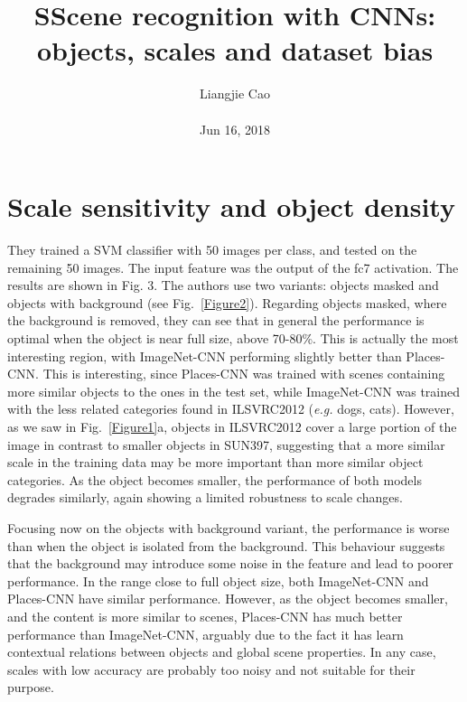 \documentclass[10pt,twocolumn,letterpaper]{article}
\begin{document}
\title{\textbf{SScene recognition with CNNs: objects, scales and dataset bias}}
\author{Liangjie Cao\\\\ Jun 16, 2018}
\maketitle
\section{Scale sensitivity and object density}
 They trained a SVM classifier with 50 images per class, and tested on the remaining 50 images. The input feature was the output of the fc7 activation. The results are shown in Fig. 3. The authors use two variants: objects masked and objects with background (see Fig.~\ref{Figure2}). Regarding objects masked, where the background is removed, they can see that in general the performance is optimal when the object is near full size, above 70-80\%. This is actually the most interesting region, with ImageNet-CNN performing slightly better than Places-CNN. This is interesting, since Places-CNN was trained with scenes containing more similar objects to the ones in the test set, while ImageNet-CNN was trained with the less related categories found in ILSVRC2012 (\emph{e.g.} dogs, cats). However, as we saw in Fig.~\ref{Figure1}a, objects in ILSVRC2012 cover a large portion of the image in contrast to smaller objects in SUN397, suggesting that a more similar scale in the training data may be more important than more similar object categories. As the object becomes smaller, the performance of both models degrades similarly, again showing a limited robustness to scale changes.
 \par Focusing now on the objects with background variant, the performance is worse than when the object is isolated from the background. This behaviour suggests that the background may introduce some noise in the feature and lead to poorer performance. In the range close to full object size, both ImageNet-CNN and Places-CNN have similar performance. However, as the object becomes smaller, and the content is more similar to scenes, Places-CNN has much better performance than ImageNet-CNN, arguably due to the fact it has learn contextual relations between objects and global scene properties. In any case, scales with low accuracy are probably too noisy and not suitable for their purpose.
\end{document}
